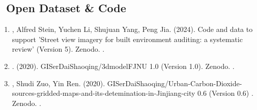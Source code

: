 \subsection*{\texorpdfstring{\faBook\ Open Dataset \& Code}{Open Dataset \& Code}}
\begin{enumerate}
\item
   \Shaoqing, Alfred Stein, Yuchen Li, Shujuan Yang, Peng Jia. (2024).
    Code and data to support 'Street view imagery for built environment auditing: a systematic review'  (Version 5). Zenodo. 
    .
\item
   \Shaoqing. (2020).
    GISerDaiShaoqing/3dmodelFJNU 1.0 (Version 1.0). Zenodo. 
    .
\item
   \Shaoqing, Shudi Zuo, Yin Ren. (2020).
    GISerDaiShaoqing/Urban-Carbon-Dioxide-sources-gridded-maps-and-its-detemination-in-Jinjiang-city 0.6 (Version 0.6) . Zenodo. 
    .
\end{enumerate}